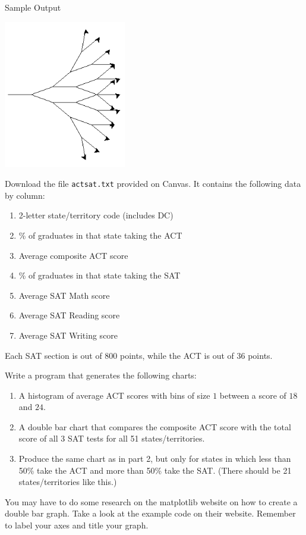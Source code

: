 \documentclass[11pt]{cselabheader}
\begin{document}
\begin{ex}[navigate3.py]
  Sample Output
  \begin{center}
    \includegraphics[width=0.4\textwidth]{img/nav3_example}
  \end{center}
\end{ex}
\begin{ex}[testscores.py]
  Download the file \texttt{actsat.txt} provided on Canvas. It contains the
  following data by column:

  \begin{enumerate}
    \item 2-letter state/territory code (includes DC)
    \item \% of graduates in that state taking the ACT
    \item Average composite ACT score
    \item \% of graduates in that state taking the SAT
    \item Average SAT Math score
    \item Average SAT Reading score
    \item Average SAT Writing score
  \end{enumerate}

  Each SAT section is out of 800 points, while the ACT is out of 36 points.

  Write a program that generates the following charts:
  \begin{enumerate}
    \item A histogram of average ACT scores with bins of size $1$ between a
      score of $18$ and $24$.
    \item A double bar chart that compares the composite ACT score with the
      total score of all 3 SAT tests for all 51 states/territories.
    \item Produce the same chart as in part 2, but only for states in which
      less than 50\% take the ACT and more than 50\% take the SAT. (There
      should be 21 states/territories like this.)
  \end{enumerate}

  You may have to do some research on the matplotlib website on how to create
  a double bar graph. Take a look at the example code on their website.
  Remember to label your axes and title your graph.
\end{ex}
\end{document}
